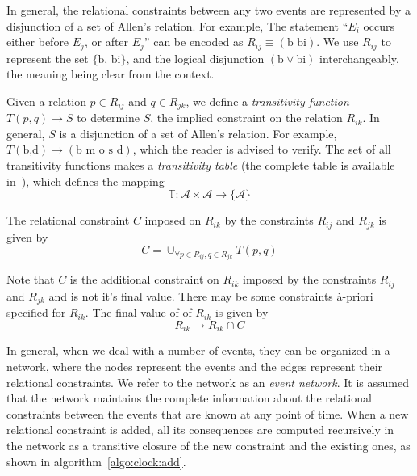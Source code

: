 In general, the relational constraints between any two events are represented by a disjunction of a set of Allen's relation. For 
example, The statement ``$E_i$ occurs either before $E_j$, or after $E_j$'' can be encoded as $R_{ij} \equiv (\text{b bi})$.  
We use $R_{ij}$ to represent the set $\{\text{b, bi}\}$, and the logical disjunction $(\text{b} \vee \text{bi})$ interchangeably,
the meaning being clear from the context. 

\noindent
{}
Given a relation $p \in R_{ij}$ and $q \in R_{jk}$, we define a {\em transitivity function} $T(p,q) \rightarrow S$ to determine
$S$, the implied constraint on the relation $R_{ik}$. In general, $S$ is a disjunction of a set of Allen's relation. For example,
$T(\text{b,d}) \rightarrow (\text{b m o s d})$, which the reader is advised to verify. The set of all transitivity functions makes
a {\em transitivity table} (the complete table is available in~\cite{Allen:1983}), which defines the mapping
\begin{equation}
	\mathbb{T}: \mathcal{A} \times \mathcal{A} \rightarrow \{ \mathcal{A} \}
\end{equation}

\noindent
The relational constraint $C$ imposed on $R_{ik}$ by the constraints $R_{ij}$ and $R_{jk}$ is given by
\begin{equation}
	C = \cup_{\forall p \in R_{ij}, q \in R_{jk}} T(p,q)
\label{eqn:clock:implication}
\end{equation}

\noindent
Note that $C$ is the additional constraint on $R_{ik}$ imposed by the constraints $R_{ij}$ and $R_{jk}$ and is not it's final value. 
There may be some constraints \`{a}-priori specified for $R_{ik}$. The final value of of $R_{ik}$ is given by
\begin{equation}
	R_{ik} \rightarrow R_{ik} \cap C
\end{equation}

In general, when we deal with a number of events, they can be organized in a network, where the nodes represent the events and the 
edges represent their relational constraints. We refer to the network as an {\em event network}. It is assumed that the network maintains 
the complete information about the relational constraints between the events that are known at any point of time. When a new relational 
constraint is added, all its consequences are computed recursively in the network as a transitive closure of the new constraint and the 
existing ones, as shown in algorithm~\ref{algo:clock:add}. 

